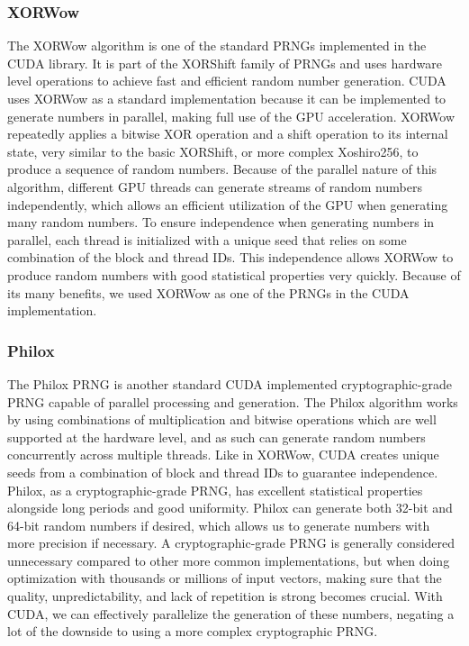 \documentclass{article}
\begin{document}
            \subsubsection{XORWow}
The XORWow algorithm is one of the standard PRNGs implemented in the CUDA library. It is part of the XORShift family of PRNGs and uses hardware level operations to achieve fast and efficient random number generation. CUDA uses XORWow as a standard implementation because it can be implemented to generate numbers in parallel, making full use of the GPU acceleration. XORWow repeatedly applies a bitwise XOR operation and a shift operation to its internal state, very similar to the basic XORShift, or more complex Xoshiro256, to produce a sequence of random numbers. Because of the parallel nature of this algorithm, different GPU threads can generate streams of random numbers independently, which allows an efficient utilization of the GPU when generating many random numbers. To ensure independence when generating numbers in parallel, each thread is initialized with a unique seed that relies on some combination of the block and thread IDs. This independence allows XORWow to produce random numbers with good statistical properties very quickly. Because of its many benefits, we used XORWow as one of the PRNGs in the CUDA implementation.

            \subsubsection{Philox}
The Philox PRNG is another standard CUDA implemented cryptographic-grade PRNG capable of parallel processing and generation. The Philox algorithm works by using combinations of multiplication and bitwise operations which are well supported at the hardware level, and as such can generate random numbers concurrently across multiple threads. Like in XORWow, CUDA creates unique seeds from a combination of block and thread IDs to guarantee independence. Philox, as a cryptographic-grade PRNG, has excellent statistical properties alongside long periods and good uniformity. Philox can generate both 32-bit and 64-bit random numbers if desired, which allows us to generate numbers with more precision if necessary. A cryptographic-grade PRNG is generally considered unnecessary compared to other more common implementations, but when doing optimization with thousands or millions of input vectors, making sure that the quality, unpredictability, and lack of repetition is strong becomes crucial. With CUDA, we can effectively parallelize the generation of these numbers, negating a lot of the downside to using a more complex cryptographic PRNG. 
\end{document}
